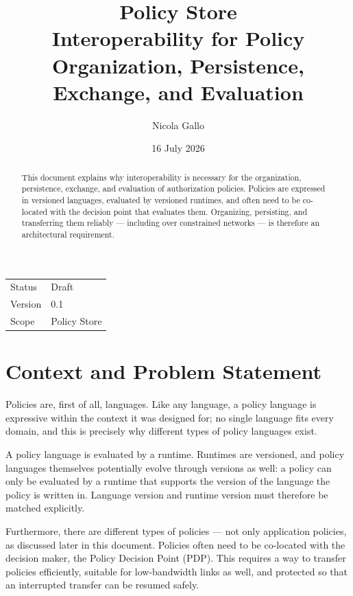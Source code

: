 \documentclass[11pt,a4paper]{article}
\title{\textbf{Policy Store}\\[0.3em]
\large Interoperability for Policy Organization, Persistence,\\
\large Exchange, and Evaluation}
\author{Nicola Gallo}
\date{16 July 2026}
\begin{document}
\maketitle
\thispagestyle{empty}

\begin{center}
\small
\begin{tabular}{@{}ll@{}}
\toprule
Status   & Draft \\
Version  & 0.1 \\
Scope    & Policy Store \\
\bottomrule
\end{tabular}
\end{center}

\begin{abstract}
\noindent
This document explains why interoperability is necessary for the
organization, persistence, exchange, and evaluation of authorization
policies. Policies are expressed in versioned languages,
evaluated by versioned runtimes, and often need to be co-located with the
decision point that evaluates them. Organizing, persisting, and transferring
them reliably --- including over constrained networks --- is therefore an
architectural requirement.
\end{abstract}

\tableofcontents
\newpage

\section{Context and Problem Statement}

Policies are, first of all, languages. Like any language, a policy language
is expressive within the context it was designed for; no single language
fits every domain, and this is precisely why different types of policy
languages exist.

A policy language is evaluated by a runtime. Runtimes are versioned, and
policy languages themselves potentially evolve through versions as well:
a policy can only be evaluated by a runtime that supports the version of
the language the policy is written in. Language version and runtime version
must therefore be matched explicitly.

Furthermore, there are different types of policies --- not only application
policies, as discussed later in this document. Policies often need to be
co-located with the decision maker, the Policy Decision Point (PDP). This
requires a way to transfer policies efficiently, suitable for low-bandwidth
links as well, and protected so that an interrupted transfer can be resumed
safely.
\end{document}
